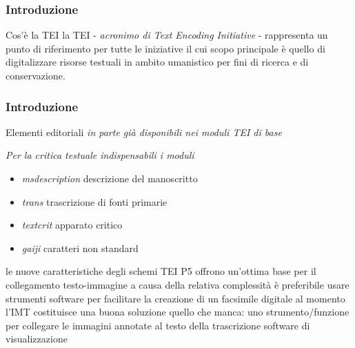 \begin{frame}
    \frametitle{Introduzione}
    \addtocounter{nframe}{1}
    

    \begin{block}{Cos'è la TEI}
        la TEI - \textit{acronimo di Text Encoding Initiative} - rappresenta un punto di riferimento per tutte le iniziative il cui scopo principale è quello di digitalizzare risorse testuali in ambito umanistico per fini di ricerca e di conservazione.
    \end{block}
    
\end{frame}

\begin{frame}
    \frametitle{Introduzione}
    \addtocounter{nframe}{1}
    

    \begin{block}{Elementi editoriali}
        \emph{in parte già disponibili nei moduli TEI di base}
        
        \textit{Per la critica testuale indispensabili i moduli}
        \begin{itemize}
            \item \emph{msdescription} descrizione del manoscritto 
            \item \emph{trans} trascrizione di fonti primarie 
            \item \emph{textcrit} apparato critico
            \item \emph{gaiji} caratteri non standard
        \end{itemize}
    \end{block}
    
\end{frame}

le nuove caratteristiche degli schemi TEI P5 offrono un’ottima base per il collegamento testo-immagine
a causa della relativa complessità è preferibile usare strumenti software per facilitare la creazione di un facsimile digitale
al momento l’IMT costituisce una buona soluzione quello che manca:
uno strumento/funzione per collegare le immagini annotate al testo della trascrizione
software di visualizzazione


